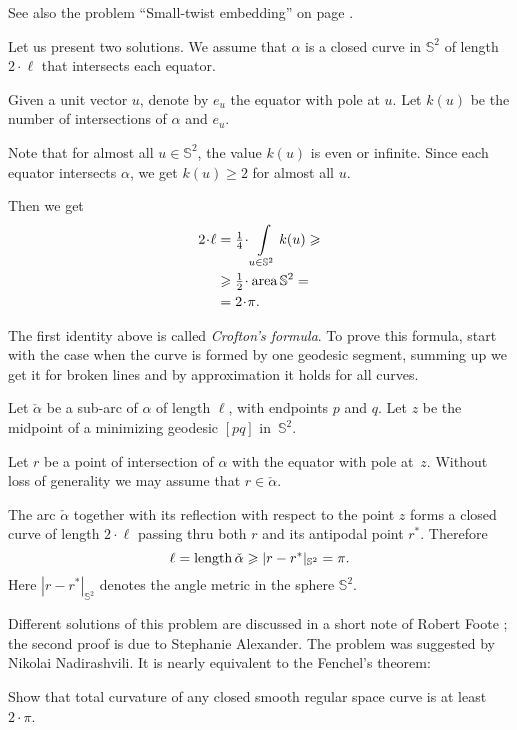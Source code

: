 See also the problem ``Small-twist embedding'' on page \pageref{Small-twist embedding}.

Let us present two solutions.
We assume that $\alpha$ is a closed curve in $\mathbb{S}^2$ of length $2\cdot\ell$ that intersects each equator.

Given a unit vector $u$, denote by $e_u$ the equator with pole at $u$.
Let $k(u)$ be the number of intersections
of $\alpha$ and $e_u$.

Note that for almost all $u\in \mathbb{S}^2$, the value $k(u)$ is even or infinite.
Since each equator intersects $\alpha$, we get $k(u)\ge 2$ for almost all $u$.

Then we get
\begin{align*}
2\cdot\ell&=\tfrac14\cdot\int\limits_{u\in \mathbb{S}^2}k(u)\ge 
\\
&\ge\tfrac12\cdot\area\mathbb{S}^2=
\\
&=2\cdot\pi.
\end{align*}

The first identity above is called \emph{Crofton's formula}.
To prove this formula, start with the case when the curve is formed by one geodesic segment,
summing up we get it for broken lines
and by approximation it holds for all curves.
\qeds

Let $\check\alpha$ be a sub-arc of $\alpha$ of length $\ell$, with endpoints $p$ and $q$. 
Let $z$ be the midpoint of a minimizing geodesic $[pq]$ in~$\mathbb{S}^2$. 

Let $r$ be a point of intersection of $\alpha$ with the equator with pole at~$z$. 
Without loss of generality we may assume that $r\in\check\alpha$. 

The arc $\check\alpha$ together with its reflection with respect to the point $z$ forms a closed curve of length $2\cdot \ell$ passing thru both $r$ and its antipodal point $r^{*}$.
Therefore 
\[\ell=\operatorname{\rm length} \check\alpha\geqslant |r-r^{*}|_{\mathbb S^2}=\pi.\]
Here $|r-r^{*}|_{\mathbb S^2}$ 
denotes the angle metric in the sphere $\mathbb S^2$.\qeds

Different solutions of this problem are discussed in a short note of Robert Foote \cite{foote};
the second proof is due to Stephanie Alexander.
The problem was suggested by Nikolai Nadirashvili.
It is nearly equivalent to the Fenchel's theorem: 

\begin{pr}
Show that total curvature of any closed smooth regular space curve is at least $2\cdot\pi$.
\end{pr}

